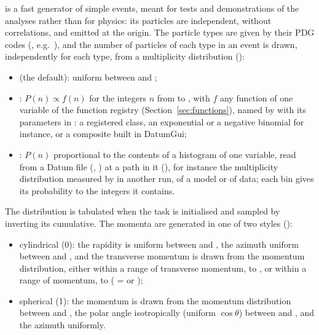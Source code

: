  is a fast generator of simple events, meant for tests and demonstrations of the analyses rather
than for physics: its particles are independent, without correlations, and emitted at the origin. The particle types
are given by their PDG codes (, e.g.\ ), and the number of particles of
each type in an event is drawn, independently for each type, from a multiplicity distribution
():
\begin{itemize}
  \item {} (the default): uniform between  and ;
  \item {}: $P(n) \propto f(n)$ for the integers $n$ from  to , with $f$ any
  function of one variable of the function registry (Section~\ref{sec:functions}), named by
   with its parameters in : a registered class, an exponential
  or a negative binomial for instance, or a composite built in DatumGui;
  \item {}: $P(n)$ proportional to the contents of a histogram of one variable, read from a Datum file
  (, ) at a path in it (), for instance
  the multiplicity distribution measured by  in another run, of a model or of data; each
  bin gives its probability to the integers it contains.
\end{itemize}
The distribution is tabulated when the task is initialised and sampled by inverting its cumulative. The momenta are
generated in one of two styles ():
\begin{itemize}
  \item cylindrical (0): the rapidity is uniform between  and , the azimuth uniform
  between  and , and the transverse momentum is drawn from the momentum distribution,
  either within a range of transverse momentum,  to , or within a range of momentum,
   to  ( =  or );
  \item spherical (1): the momentum is drawn from the momentum distribution between  and , the
  polar angle isotropically (uniform $\cos\theta$) between  and , and the azimuth
  uniformly.
\end{itemize}
